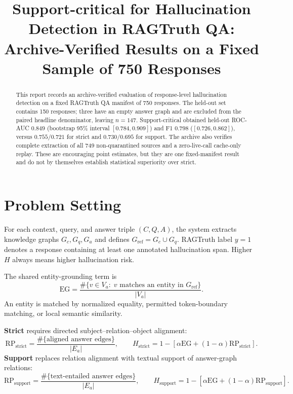 \documentclass[11pt,a4paper]{article}
\title{\vspace{-1.2em}\textbf{Support-critical for Hallucination Detection in RAGTruth QA:}\\[-0.25em]
Archive-Verified Results on a Fixed Sample of 750 Responses}
\author{}
\date{}
\newcommand{\EG}{\mathrm{EG}}
\newcommand{\RP}{\mathrm{RP}}
\begin{document}
\maketitle
\vspace{-1.7em}

\begin{abstract}
This report records an archive-verified evaluation of response-level hallucination detection on a fixed RAGTruth QA manifest of 750 responses.  The held-out set contains 150 responses; three have an empty answer graph and are excluded from the paired headline denominator, leaving $n=147$.  Support-critical obtained held-out ROC-AUC $0.849$ (bootstrap 95\% interval $[0.784,0.909]$) and F1 $0.798$ ($[0.726,0.862]$), versus $0.755/0.721$ for strict and $0.730/0.695$ for support.  The archive also verifies complete extraction of all 749 non-quarantined sources and a zero-live-call cache-only replay.  These are encouraging point estimates, but they are one fixed-manifest result and do not by themselves establish statistical superiority over strict.
\end{abstract}

\section{Problem Setting}
For each context, query, and answer triple $(C,Q,A)$, the system extracts knowledge graphs $G_c,G_q,G_a$ and defines $G_{\mathrm{ref}}=G_c\cup G_q$.  RAGTruth label $y=1$ denotes a response containing at least one annotated hallucination span.  Higher $H$ always means higher hallucination risk.

The shared entity-grounding term is
\begin{equation}
\EG=\frac{\#\{v\in V_a:\;v\text{ matches an entity in }G_{\mathrm{ref}}\}}{|V_a|}.
\end{equation}
An entity is matched by normalized equality, permitted token-boundary matching, or local semantic similarity.

\textbf{Strict} requires directed subject--relation--object alignment:
\begin{equation}
\RP_{\mathrm{strict}}=\frac{\#\{\text{aligned answer edges}\}}{|E_a|},\qquad
H_{\mathrm{strict}}=1-[\alpha\EG+(1-\alpha)\RP_{\mathrm{strict}}].
\end{equation}
\textbf{Support} replaces relation alignment with textual support of answer-graph relations:
\begin{equation}
\RP_{\mathrm{support}}=\frac{\#\{\text{text-entailed answer edges}\}}{|E_a|},\qquad
H_{\mathrm{support}}=1-[\alpha\EG+(1-\alpha)\RP_{\mathrm{support}}].
\end{equation}
\end{document}
